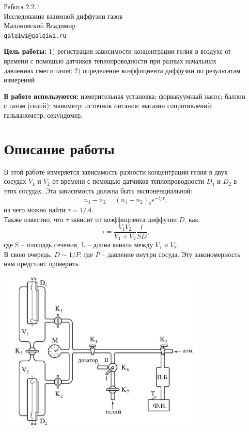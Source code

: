 
\usepackage{booktabs}
\usepackage{multirow}



\begin{center}
  \LARGE{Работа 2.2.1}\\[0.2cm]
  \LARGE{Исследование взаимной диффузии газов}\\[0.2cm]
  \large{Малиновский Владимир}\\[0.2cm]
  \normalsize{\texttt{galqiwi@galqiwi.ru}}
\end{center}

\textbf{Цель работы:} 1) регистрация зависимости концентрации гелия в воздухе от времени с помощью датчиков теплопроводности при разных начальных давлениях смеси газов; 2) определение коэффициента диффузии по результатам измерений

\textbf{В работе используются:} измерительная установка; форвакуумный насос; баллон с газом (гелий); манометр; источник питания; магазин сопротивлений; гальванометр; секундомер.

\section*{Описание работы}
В этой работе измеряется зависимость разности концентрации гелия в двух сосудах $V_1$ и $V_2$ от времени с помощью датчиков теплопроводности $D_1$ и $D_2$ в этих сосудах. Эта зависимость должна быть экспоненциальной:
$$n_1 - n_2 = (n_1 - n_2)_0e^{-t/\tau},$$
из чего можно найти $\tau = 1 / A$.\\
Также известно, что $\tau$ зависит от коэффициента диффузии $D$, как
$$\tau = \frac{V_1V_2}{V_1 + V_2} \frac{l}{SD},$$
где S -- площадь сечения, L -- длина канала между $V_1$ и $V_2$.\\
В свою очередь, $D\sim1/P$, где $P$ -- давление внутри сосуда. Эту закономерность нам предстоит проверить.
\begin{center}
	\includegraphics[width=0.80\textwidth]{setup.png}
\end{center}
\newpage

